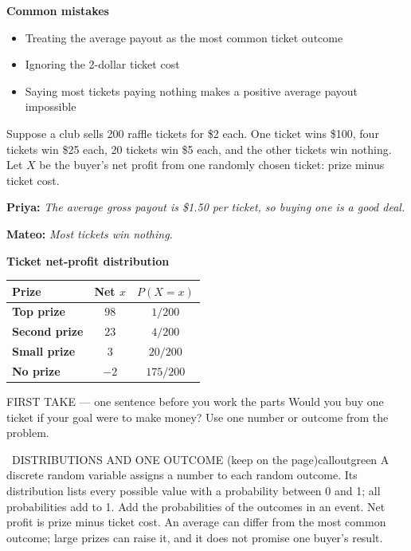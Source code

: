 \documentclass[11pt]{article}
\begin{document}
\textbf{Common mistakes}
\begin{itemize}[leftmargin=1.5em,itemsep=2pt,topsep=2pt]
  \item Treating the average payout as the most common ticket outcome
  \item Ignoring the 2-dollar ticket cost
  \item Saying most tickets paying nothing makes a positive average payout impossible
\end{itemize}

\clearpage
{}

Suppose a club sells 200 raffle tickets for \$2 each. One ticket wins \$100, four tickets win \$25 each, 20 tickets win \$5 each, and the other tickets win nothing. Let $X$ be the buyer's net profit from one randomly chosen ticket: prize minus ticket cost.\par\smallskip \textbf{Priya:} \emph{The average gross payout is \$1.50 per ticket, so buying one is a good deal.}\par \textbf{Mateo:} \emph{Most tickets win nothing.}\par
\begin{center}
\textbf{Ticket net-profit distribution}\par\smallskip
\begin{tabular}{|l|c|c|}
\hline
\textbf{Prize} & \textbf{Net $x$} & \textbf{$P(X=x)$} \\ \hline
\textbf{Top prize} & $98$ & $1/200$ \\ \hline
\textbf{Second prize} & $23$ & $4/200$ \\ \hline
\textbf{Small prize} & $3$ & $20/200$ \\ \hline
\textbf{No prize} & $-2$ & $175/200$ \\ \hline
\end{tabular}
\end{center}
\begin{firsttakebox}{FIRST TAKE --- one sentence before you work the parts}
Would you buy one ticket if your goal were to make money? Use one number or outcome from the problem.\par
{}
\end{firsttakebox}

\begin{callout}{\IconBook\ DISTRIBUTIONS AND ONE OUTCOME (keep on the page)}{calloutgreen}
A discrete random variable assigns a number to each random outcome. Its distribution lists every possible value with a probability between 0 and 1; all probabilities add to 1. Add the probabilities of the outcomes in an event. Net profit is prize minus ticket cost. An average can differ from the most common outcome; large prizes can raise it, and it does not promise one buyer's result.
\end{callout}
\end{document}
